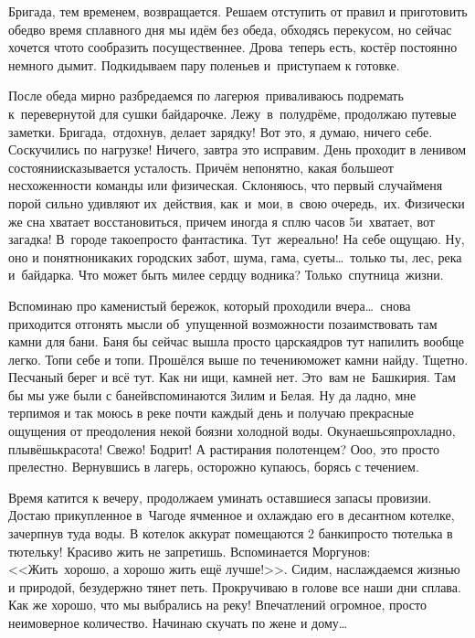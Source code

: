 Бригада, тем временем, возвращается. Решаем отступить от правил и приготовить обед\mdash во время сплавного дня мы идём без обеда, обходясь перекусом, но сейчас хочется что\sdash то сообразить посущественнее. Дрова~теперь есть, костёр постоянно немного дымит. Подкидываем пару поленьев и~приступаем к готовке.

После обеда мирно разбредаемся по лагерю\mdash я~приваливаюсь подремать к~перевернутой для сушки байдарочке. Лежу~в~полудрёме, продолжаю путевые заметки. Бригада,~отдохнув, делает зарядку! Вот это, я думаю, ничего себе. Соскучились по нагрузке! Ничего, завтра это исправим. День проходит в ленивом состоянии\mdash сказывается усталость. Причём непонятно, какая больше\mdash от несхоженности команды или физическая. Склоняюсь, что первый случай\mdash меня порой сильно удивляют их~действия, как~и~мои, в~свою очередь,~их. Физически же сна хватает восстановиться, причем иногда я сплю часов 5\mdash и~хватает, вот загадка! В~городе такое\mdash просто фантастика. Тут~же\mdash реально! На себе ощущаю. Ну, оно и понятно\mdash никаких городских забот, шума, гама, суеты\ldots~только ты, лес, река и~байдарка. Что может быть милее сердцу водника? Только~спутница~жизни.

Вспоминаю про каменистый бережок, который проходили вчера\ldots~снова приходится отгонять мысли об~упущенной возможности позаимствовать там камни для бани. Баня бы сейчас вышла просто царская\mdash дров тут напилить вообще легко. Топи себе и топи. Прошёлся выше по течению\mdash может камни найду. Тщетно. Песчаный берег и всё тут. Как ни ищи, камней нет. Это~вам не~Башкирия. Там бы мы уже были с баней\mdash вспоминаются Зилим и Белая. Ну да ладно, мне терпимо\mdash я и так моюсь в реке почти каждый день и получаю прекрасные ощущения от преодоления некой боязни холодной воды. Окунаешься\mdash прохладно, плывёшь\mdash красота! Свежо! Бодрит! А растирания полотенцем? О\sdash о\sdash о, это просто прелестно. Вернувшись в лагерь, осторожно купаюсь, борясь с течением. 

Время катится к вечеру, продолжаем уминать оставшиеся запасы провизии. Достаю прикупленное в~Чагоде ячменное и охлаждаю его в десантном котелке, зачерпнув туда воды. В котелок аккурат помещаются 2 банки\mdash просто тютелька в тютельку! Красиво жить не запретишь. Вспоминается Моргунов: <<Жить~хорошо, а хорошо жить ещё лучше!>>. Сидим, наслаждаемся жизнью и природой, безудержно тянет петь. Прокручиваю в голове все наши дни сплава. Как же хорошо, что мы выбрались на реку! Впечатлений огромное, просто неимоверное количество. Начинаю скучать по жене и дому\ldots~

